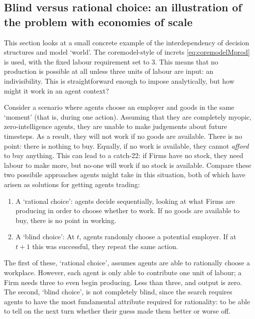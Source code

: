 {\subsection{Blind versus rational choice: an illustration of the problem with economies of scale \label{sec:blindvsrational}}

This section looks at a small concrete example of the interdependency of decision structures and model `world'. The \gls{coremodel}-style of \gls{increts} \eqref{eq:coremodelMprod} is used, with the fixed labour requirement set to 3. This means that no production is possible at all unless three units of labour are input: an indivisibility. This is straightforward enough to impose analytically, but how might it work in an agent context? 

Consider a scenario where agents choose an employer and goods in the same `moment' (that is, during one action). Assuming that they are completely myopic, zero-intelligence agents, they are unable to make judgements about future timesteps. As a result, they will not work if no goods are available. There is no point: there is nothing to buy. Equally, if no work is available, they cannot \emph{afford} to buy anything. This can lead to a catch-22: if Firms have no stock, they need labour to make more, but no-one will work if no stock is available. Compare these two possibile approaches agents might take in this situation, both of which have arisen as solutions for getting agents trading:

\begin{enumerate}
	\item A `rational choice': agents decide sequentially, looking at what Firms are producing in order to choose whether to work. If no goods are available to buy, there is no point in working.
	\item A `blind choice': At $t$, agents randomly choose a potential employer. If at $t+1$ this was successful, they repeat the same action. 
\end{enumerate}

The first of these, `rational choice', assumes agents are able to rationally choose a workplace. However, each agent is only able to contribute one unit of labour; a Firm needs three to even begin producing. Less than three, and output is zero. The second, `blind choice', is not completely blind, since the search requires agents to have the most fundamental attribute required for rationality: to be able to tell on the next turn whether their guess made them better or worse off. 

}
